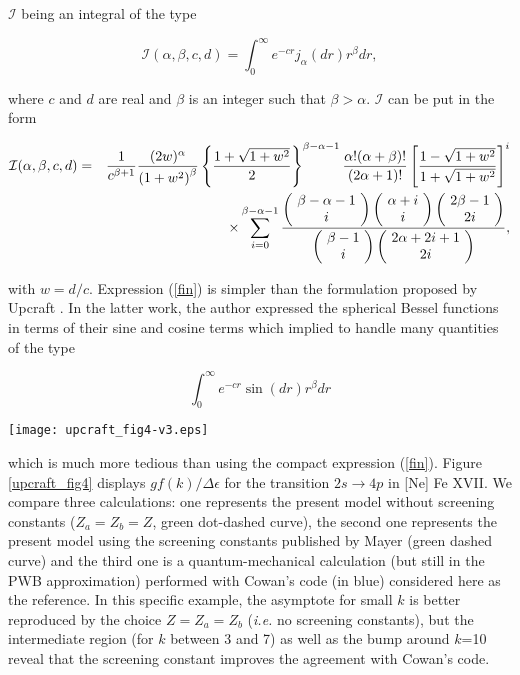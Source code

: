 \documentclass[a4paper,10pt]{article}
\begin{document}
\noindent $\mathcal{I}$ being an integral of the type

\begin{equation*}
\mathcal{I}(\alpha,\beta,c,d)=\int_0^{\infty}e^{-cr}j_{\alpha}(dr)r^{\beta}dr,
\end{equation*}

\noindent where $c$ and $d$ are real and $\beta$ is an integer such that $\beta>\alpha$. $\mathcal{I}$ can be put in the form

\begin{eqnarray}\label{fin}
\mathcal{I}(\alpha,\beta,c,d)&=&\frac{1}{c^{\beta+1}}\frac{(2w)^{\alpha}}{\left(1+w^2\right)^{\beta}}\left\{\frac{1+\sqrt{1+w^2}}{2}\right\}^{\beta-\alpha-1}\frac{\alpha!(\alpha+\beta)!}{(2\alpha+1)!}\left[\frac{1-\sqrt{1+w^2}}{1+\sqrt{1+w^2}}\right]^i\nonumber\\
& &\times\sum_{i=0}^{\beta-\alpha-1}\frac{\bin{\beta-\alpha-1}{i}\bin{\alpha+i}{i}\bin{2\beta-1}{2i}}{\bin{\beta-1}{i}\bin{2\alpha+2i+1}{2i}},
\end{eqnarray}

\noindent with $w=d/c$. Expression (\ref{fin}) is simpler than the formulation proposed by Upcraft \cite{UPCRAFT10}. In the latter work, the author expressed the spherical Bessel functions in terms of their sine and cosine terms which implied to handle many quantities of the type

\begin{equation*}
\int_0^{\infty}e^{-cr}\sin(dr)r^{\beta}dr
\end{equation*}

\begin{figure*}
\vspace{1cm}
\begin{center}
\texttt{[image: upcraft\_fig4-v3.eps]}
\end{center}
\caption{(Color online) $gf(k)/\Delta\epsilon$ (at. units) for transition $2s\rightarrow 4p$ in [Ne] Fe XVII. Blue curve: Cowan's code computation \cite{COWAN81}, green dot-dashed curve: unscreened case ($Z_a=Z_b=Z$), red dashed curve: use of Mayer's screening constants \cite{MAYER47}.}\label{upcraft_fig4}
\vspace{1cm}
\end{figure*}

\noindent which is much more tedious than using the compact expression (\ref{fin}). Figure \ref{upcraft_fig4} displays $gf(k)/\Delta\epsilon$ for the transition $2s\rightarrow 4p$ in [Ne] Fe XVII. We compare three calculations: one represents the present model without screening constants ($Z_a=Z_b=Z$, green dot-dashed curve), the second one represents the present model using the screening constants published by Mayer \cite{MAYER47} (green dashed curve) and the third one is a quantum-mechanical calculation (but still in the PWB approximation) performed with Cowan's code (in blue) considered here as the reference. In this specific example, the asymptote for small $k$ is better reproduced by the choice $Z=Z_a=Z_b$ (\textit{i.e.} no screening constants), but the intermediate region (for $k$ between 3 and 7) as well as the bump around $k$=10 reveal that the screening constant improves the agreement with Cowan's code.
\end{document}
